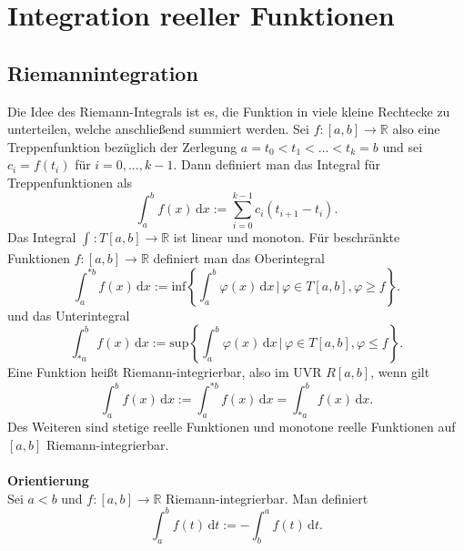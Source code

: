 \documentclass[a4paper,12pt]{article}
\newcommand{\td}{\,\text{d}}
\begin{document}
\section{Integration reeller Funktionen}
\subsection{Riemannintegration}
Die Idee des Riemann-Integrals ist es, die Funktion in viele kleine Rechtecke zu unterteilen, welche anschließend summiert werden. Sei $f:[a,b]\rightarrow \mathbb{R}$ also eine Treppenfunktion bezüglich der Zerlegung $a=t_0<t_1<\hdots <t_k=b$ und sei $c_i=f\left(t_i\right)$ für $i=0,\hdots ,k-1$. Dann definiert man das Integral für Treppenfunktionen als
\[ 
        \int_{a}^{b}f\left(x\right)\td x:=\sum_{i=0}^{k-1}c_i\left(t_{i+1}-t_i\right)
.\] 
Das Integral $\int_{}^{}:T[a,b]\rightarrow \mathbb{R}$ ist linear und monoton. Für beschränkte Funktionen $f:[a,b]\rightarrow \mathbb{R}$ definiert man das Oberintegral
\[ 
        \int_{a}^{*b}f\left(x\right)\td x:=\text{inf}\left\{\int_{a}^{b}\varphi \left(x\right)\td x\,|\, \varphi  \in T[a,b],\varphi \geq f\right\}
.\] 
und das Unterintegral
\[ 
        \int_{*a}^{b}f\left(x\right)\td x:=\text{sup}\left\{\int_{a}^{b}\varphi \left(x\right)\td x\,|\, \varphi  \in T[a,b],\varphi \leq f\right\}
.\] 
Eine Funktion heißt Riemann-integrierbar, also im UVR $R[a,b]$, wenn gilt
\[ 
        \int_{a}^{b}f\left(x\right)\td x:=\int_{a}^{*b}f\left(x\right)\td x=\int_{*a}^{b}f\left(x\right)\td x
.\] 
Des Weiteren sind stetige reelle Funktionen und monotone reelle Funktionen auf $[a,b]$ Riemann-integrierbar.
\\\hfill\\\textbf{Orientierung}\\ 
Sei $a<b$ und $f:[a,b]\rightarrow \mathbb{R}$ Riemann-integrierbar. Man definiert
\[ 
         \int_{a}^{b}f\left(t\right)\td t:=-\int_{b}^{a}f\left(t\right)\td t
.\] 
\end{document}
